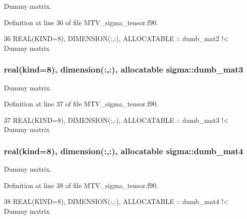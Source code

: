 Dummy matrix. 



Definition at line 36 of file M\+T\+V\+\_\+sigma\+\_\+tensor.\+f90.


\begin{DoxyCode}
36   \textcolor{keywordtype}{REAL(KIND=8)}, \textcolor{keywordtype}{DIMENSION(:,:)}, \textcolor{keywordtype}{ALLOCATABLE} :: dumb\_mat2\textcolor{comment}{ !< Dummy matrix}
\end{DoxyCode}
\subsubsection[{\texorpdfstring{dumb\+\_\+mat3}{dumb_mat3}}]{\setlength{\rightskip}{0pt plus 5cm}real(kind=8), dimension(\+:,\+:), allocatable sigma\+::dumb\+\_\+mat3\hspace{0.3cm}{\ttfamily [private]}}\hypertarget{namespacesigma_aa1cf7af9d091c183b2308f0f65786909}{}\label{namespacesigma_aa1cf7af9d091c183b2308f0f65786909}


Dummy matrix. 



Definition at line 37 of file M\+T\+V\+\_\+sigma\+\_\+tensor.\+f90.


\begin{DoxyCode}
37   \textcolor{keywordtype}{REAL(KIND=8)}, \textcolor{keywordtype}{DIMENSION(:,:)}, \textcolor{keywordtype}{ALLOCATABLE} :: dumb\_mat3\textcolor{comment}{ !< Dummy matrix}
\end{DoxyCode}
\subsubsection[{\texorpdfstring{dumb\+\_\+mat4}{dumb_mat4}}]{\setlength{\rightskip}{0pt plus 5cm}real(kind=8), dimension(\+:,\+:), allocatable sigma\+::dumb\+\_\+mat4\hspace{0.3cm}{\ttfamily [private]}}\hypertarget{namespacesigma_a74080d7fa465ba8581e0b40c20170d5f}{}\label{namespacesigma_a74080d7fa465ba8581e0b40c20170d5f}


Dummy matrix. 



Definition at line 38 of file M\+T\+V\+\_\+sigma\+\_\+tensor.\+f90.


\begin{DoxyCode}
38   \textcolor{keywordtype}{REAL(KIND=8)}, \textcolor{keywordtype}{DIMENSION(:,:)}, \textcolor{keywordtype}{ALLOCATABLE} :: dumb\_mat4\textcolor{comment}{ !< Dummy matrix}
\end{DoxyCode}
